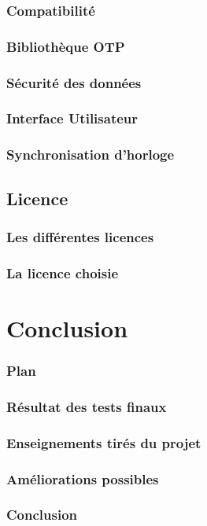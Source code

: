 \documentclass[xcolor=table]{beamer}
\begin{document}
\begin{frame}
\frametitle{Compatibilité}

\end{frame}
\begin{frame}
\frametitle{Bibliothèque OTP}
\end{frame}

\begin{frame}
\frametitle{Sécurité des données}

\end{frame}

\begin{frame}
\frametitle{Interface Utilisateur}
\end{frame}

\begin{frame}
\frametitle{Synchronisation d'horloge}
\end{frame}

\subsection{Licence}
\begin{frame}
\frametitle{Les différentes licences}

\end{frame}

\begin{frame}
\frametitle{La licence choisie}

\end{frame}

\section{Conclusion}
\begin{frame}  
\frametitle{Plan} 
\end{frame}

\begin{frame}
\frametitle{Résultat des tests finaux}

\end{frame}

\begin{frame}
\frametitle{Enseignements tirés du projet}

\end{frame}


\begin{frame}
\frametitle{Améliorations possibles}
\end{frame}

\begin{frame}
\frametitle{Conclusion}
\end{frame}




\end{document}
